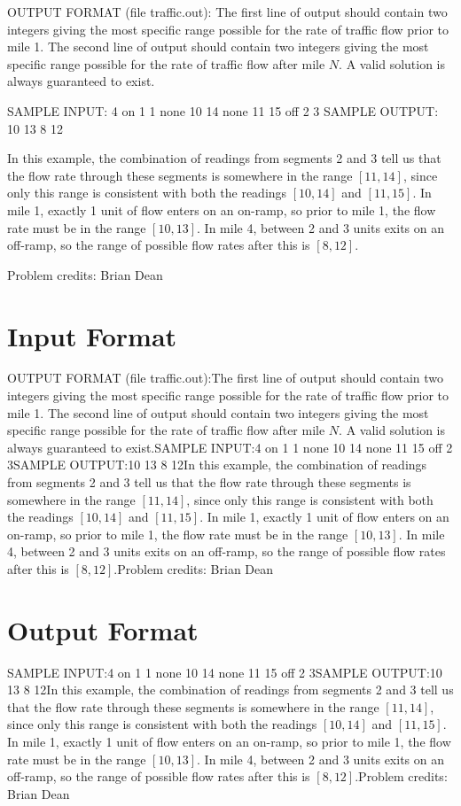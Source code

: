 \documentclass[12pt]{article}
\begin{document}
OUTPUT FORMAT (file traffic.out):
The first line of output should contain two integers giving the most specific
range possible for the rate of traffic flow prior to mile 1.  The second line of
output should contain two integers giving the most specific range possible for
the rate of traffic flow after mile $N$.  A valid solution is always guaranteed
to exist.

SAMPLE INPUT:
4
on 1 1
none 10 14
none 11 15
off 2 3
SAMPLE OUTPUT: 
10 13
8 12

In this example, the combination of readings from segments 2 and 3 tell us that
the flow rate through these segments is somewhere in the range $[11, 14]$, since
only this range is consistent with both the readings $[10,14]$ and $[11,15]$. In
mile 1, exactly 1 unit of flow enters on an on-ramp, so prior to mile 1, the
flow rate must be in the range $[10, 13]$.  In mile 4, between 2 and 3 units
exits on an off-ramp, so the range of possible flow rates after this is
$[8,12]$.

Problem credits: Brian Dean



\section*{Input Format}
OUTPUT FORMAT (file traffic.out):The first line of output should contain two integers giving the most specific
range possible for the rate of traffic flow prior to mile 1.  The second line of
output should contain two integers giving the most specific range possible for
the rate of traffic flow after mile $N$.  A valid solution is always guaranteed
to exist.SAMPLE INPUT:4
on 1 1
none 10 14
none 11 15
off 2 3SAMPLE OUTPUT:10 13
8 12In this example, the combination of readings from segments 2 and 3 tell us that
the flow rate through these segments is somewhere in the range $[11, 14]$, since
only this range is consistent with both the readings $[10,14]$ and $[11,15]$. In
mile 1, exactly 1 unit of flow enters on an on-ramp, so prior to mile 1, the
flow rate must be in the range $[10, 13]$.  In mile 4, between 2 and 3 units
exits on an off-ramp, so the range of possible flow rates after this is
$[8,12]$.Problem credits: Brian Dean

\section*{Output Format}
SAMPLE INPUT:4
on 1 1
none 10 14
none 11 15
off 2 3SAMPLE OUTPUT:10 13
8 12In this example, the combination of readings from segments 2 and 3 tell us that
the flow rate through these segments is somewhere in the range $[11, 14]$, since
only this range is consistent with both the readings $[10,14]$ and $[11,15]$. In
mile 1, exactly 1 unit of flow enters on an on-ramp, so prior to mile 1, the
flow rate must be in the range $[10, 13]$.  In mile 4, between 2 and 3 units
exits on an off-ramp, so the range of possible flow rates after this is
$[8,12]$.Problem credits: Brian Dean
\end{document}
